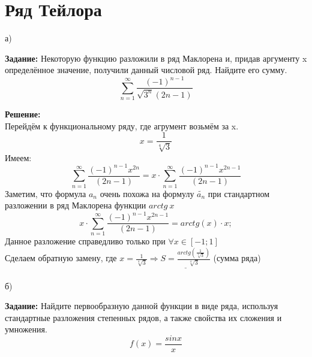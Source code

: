 \documentclass{article}
\begin{document}

\newpage


\section{Ряд Тейлора}
а)


\textbf{Задание:} Некоторую функцию разложили в ряд Маклорена и, придав аргументу x определённое
значение, получили данный числовой ряд. Найдите его сумму.\\
\begin{equation*}
    \sum_{n = 1}^{\infty} \frac{(-1)^{n-1}}{\sqrt{3^n}(2n-1)}
\end{equation*}


\textbf{Решение:}\\
Перейдём к функциональному ряду, где агрумент возьмём за x.\\
\begin{equation*}
     x = \frac{1}{\sqrt[4]{3}}
\end{equation*}
Имеем:
\begin{equation*}
    \sum_{n = 1}^{\infty} \frac{(-1)^{n-1}x^{2n}}{(2n-1)}=x\cdot \sum_{n = 1}^{\infty}\frac{(-1)^{n-1}x^{2n-1}}{(2n-1)}
\end{equation*}
Заметим, что формула $a_n$ очень похожа на формулу $\widetilde{a_n}$ при стандартном разложении в ряд Маклорена функции $arctg\ x$\\
\begin{equation*}
    x\cdot \sum_{n = 1}^{\infty}\frac{(-1)^{n-1}x^{2n-1}}{(2n-1)}=arctg(x)\cdot x;
\end{equation*}
Данное разложение справедливо только при $\forall x\in[-1;1]$\\
Сделаем обратную замену, где $x=\frac{1}{\sqrt[4]{3}}\Longrightarrow \underline{ S=\frac{arctg(\frac{1}{\sqrt[4]{3}})}{\sqrt[4]{3}}}$ (сумма ряда)
\\ \\б)


\textbf{Задание:} Найдите первообразную данной функции в виде ряда, используя стандартные разложения
степенных рядов, а также свойства их сложения и умножения.
\begin{equation*}
    f(x)=\frac{sinx}{x}
\end{equation*}
\end{document}
